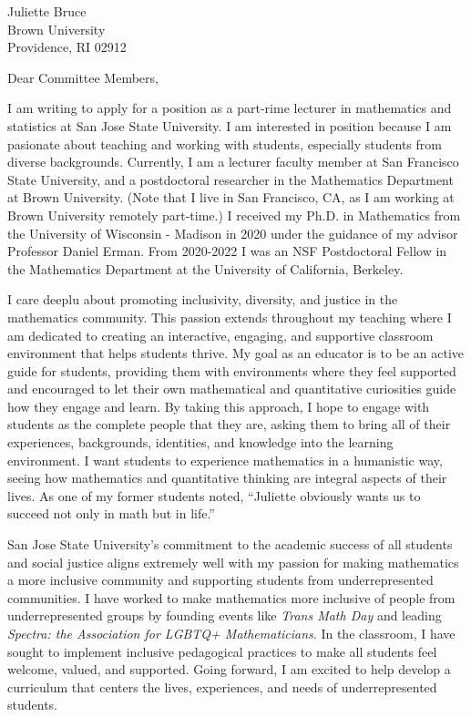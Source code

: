 \documentclass[11pt]{brownletter}
\date{November 3, 2023} %
\begin{document}
\begin{letter}{Juliette Bruce\\ 
               Brown University\\ 
               Providence, RI 02912}

\opening{Dear Committee Members,}

I am writing to apply for a position as a part-rime lecturer in mathematics and statistics at San Jose State University. I am interested in position because I am pasionate about teaching and working with students, especially students from diverse backgrounds. Currently, I am a lecturer faculty member at San Francisco State University, and a postdoctoral researcher in the Mathematics Department at Brown University. (Note that I live in San Francisco, CA, as I am working at Brown University remotely part-time.)  I received my Ph.D. in Mathematics from the University of Wisconsin - Madison in 2020 under the guidance of my advisor Professor Daniel Erman. From 2020-2022 I was an NSF Postdoctoral Fellow in the Mathematics Department at the University of California, Berkeley.

I care deeplu about promoting inclusivity, diversity, and justice in the mathematics community. This passion extends throughout my teaching where I am dedicated to creating an interactive, engaging, and supportive classroom environment that helps students thrive. My goal as an educator is to be an active guide for students, providing them with environments where they feel supported and encouraged to let their own mathematical and quantitative curiosities guide how they engage and learn. By taking this approach, I hope to engage with students as the complete people that they are, asking them to bring all of their experiences, backgrounds, identities, and knowledge into the learning environment. I want students to experience mathematics in a humanistic way, seeing how mathematics and quantitative thinking are integral aspects of their lives. As one of my former students noted, ``Juliette obviously wants us to succeed not only in math but in life.''


San Jose State University’s commitment to the academic success of all students and social justice aligns extremely well with my passion for making mathematics a more inclusive community and supporting students from underrepresented communities. I have worked to make mathematics more inclusive of people from underrepresented groups by founding events like \textit{Trans Math Day} and leading \textit{Spectra: the Association for LGBTQ+ Mathematicians}.  In the classroom, I have sought to implement inclusive pedagogical practices to make all students feel welcome, valued, and supported. Going forward, I am excited to help develop a curriculum that centers the lives, experiences, and needs of underrepresented students. 


\end{letter}
\end{document}

